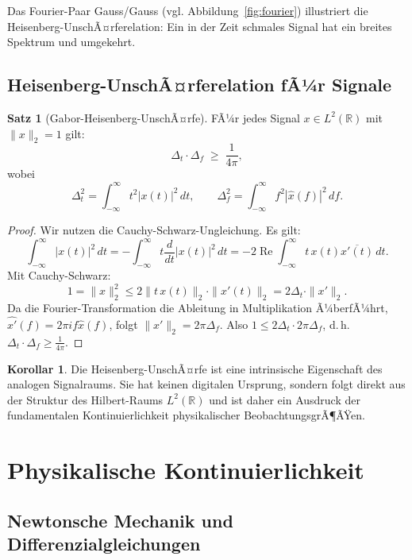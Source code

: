 ﻿\documentclass[a4paper,12pt]{article}
\theoremstyle{definition}
\newtheorem{satz}{Satz}
\newtheorem{korollar}{Korollar}
\begin{document}
Das Fourier-Paar Gauss/Gauss (vgl. Abbildung~\ref{fig:fourier}) illustriert
die Heisenberg-UnschÃ¤rferelation: Ein in der Zeit schmales Signal hat ein breites
Spektrum und umgekehrt.

\subsection{Heisenberg-UnschÃ¤rferelation fÃ¼r Signale}

\begin{satz}[Gabor-Heisenberg-UnschÃ¤rfe]
\label{satz:unschaerfe}
FÃ¼r jedes Signal $x \in L^2(\mathbb{R})$ mit $\|x\|_2 = 1$ gilt:
\[
\Delta_t \cdot \Delta_f \;\geq\; \frac{1}{4\pi},
\]
wobei
\[
\Delta_t^2 = \int_{-\infty}^{\infty} t^2 |x(t)|^2 \, dt, \qquad
\Delta_f^2 = \int_{-\infty}^{\infty} f^2 |\hat{x}(f)|^2 \, df.
\]
\end{satz}

\begin{proof}
Wir nutzen die Cauchy-Schwarz-Ungleichung.  Es gilt:
\[
\int_{-\infty}^\infty |x(t)|^2 \, dt
= -\int_{-\infty}^\infty t \frac{d}{dt}|x(t)|^2 \, dt
= -2 \operatorname{Re} \int_{-\infty}^\infty t \, x(t) \overline{x'(t)} \, dt.
\]
Mit Cauchy-Schwarz:
\[
1 = \|x\|_2^2 \leq 2\|t\, x(t)\|_2 \cdot \|x'(t)\|_2
= 2\Delta_t \cdot \|x'\|_2.
\]
Da die Fourier-Transformation die Ableitung in Multiplikation Ã¼berfÃ¼hrt,
$\widehat{x'}(f) = 2\pi i f \hat{x}(f)$, folgt $\|x'\|_2 = 2\pi \Delta_f$.
Also $1 \leq 2\Delta_t \cdot 2\pi\Delta_f$, d.\,h.
$\Delta_t \cdot \Delta_f \geq \frac{1}{4\pi}$.
\end{proof}

\begin{korollar}
Die Heisenberg-UnschÃ¤rfe ist eine intrinsische Eigenschaft des analogen Signalraums.
Sie hat keinen digitalen Ursprung, sondern folgt direkt aus der Struktur des Hilbert-Raums
$L^2(\mathbb{R})$ und ist daher ein Ausdruck der fundamentalen Kontinuierlichkeit
physikalischer BeobachtungsgrÃ¶ÃŸen.
\end{korollar}

\section{Physikalische Kontinuierlichkeit}
\label{sec:physik}

\subsection{Newtonsche Mechanik und Differenzialgleichungen}
\end{document}
